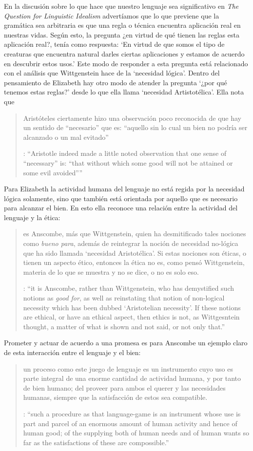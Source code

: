 En la discusión sobre lo que hace que nuestro lenguaje sea significativo en \emph{The Question for Linguistic Idealism} advertíamos que lo que previene que la gramática sea arbitraria es que una regla o técnica encuentra aplicación real en nuestras vidas. Según esto, la pregunta ¿en virtud de qué tienen las reglas esta aplicación real?, tenía como respuesta: \enquote*{En virtud de que somos el tipo de creaturas que encuentra natural darles ciertas aplicaciones y estamos de acuerdo en descubrir estos usos.} Este modo de responder a esta pregunta está relacionado con el análisis que Wittgenstein hace de la `necesidad lógica'. Dentro del pensamiento de Elizabeth hay otro modo de atender la pregunta \enquote*{¿por qué tenemos estas reglas?} desde lo que ella llama `necesidad Artistotélica'. Ella nota que \blockquote[{\cite[100]{anscombe1981erp:rrp}}: \enquote{Aristotle indeed made a little noted observation that one sense of ``necessary'' is: ``that without which some good will not be attained or some evil avoided''}]{Aristóteles ciertamente hizo una observación poco reconocida de que hay un sentido de ``necesario'' que es: ``aquello sin lo cual un bien no podría ser alcanzado o un mal evitado''}. Para Elizabeth la actividad humana del lenguaje no está regida por la necesidad lógica solamente, sino que también está orientada por aquello que es necesario para alcanzar el bien. En esto ella reconoce una relación entre la actividad del lenguaje y la ética: \blockquote[{\cite[221]{teichmann2008ans}}: \enquote{it is Anscombe, rather than Wittgenstein, who has demystified such notions as \emph{good for}, as well as reinstating that notion of non-logical necessity which has been dubbed `Aristotelian necessity'. If these notions are ethical, or have an ethical aspect, then ethics is not, as Wittgesntein thought, a matter of what is shown and not said, or not only that.}]{es Anscombe, más que Wittgenstein, quien ha desmitificado tales nociones como \emph{bueno para}, además de reintegrar la noción de necesidad no-lógica que ha sido llamada `necesidad Aristotélica'. Si estas nociones son éticas, o tienen un aspecto ético, entonces la ética no es, como pensó Wittgenstein, materia de lo que se muestra y no se dice, o no es solo eso.} Prometer y actuar de acuerdo a una promesa es para Anscombe un ejemplo claro de esta interacción entre el lenguaje y el bien: \blockquote[{\cite[18]{anscombe1981erp:pj}}: \enquote{such a procedure as that language-game is an instrument whose use is part and parcel of an enormous amount of human activity and hence of human good; of the supplying both of human needs and of human wants so far as the satisfactions of these are compossible.}]{un proceso como este juego de lenguaje es un instrumento cuyo uso es parte integral de una enorme cantidad de actividad humana, y por tanto de bien humano; del proveer para ambos el querer y las necesidades humanas, siempre que la satisfacción de estos sea compatible.}

